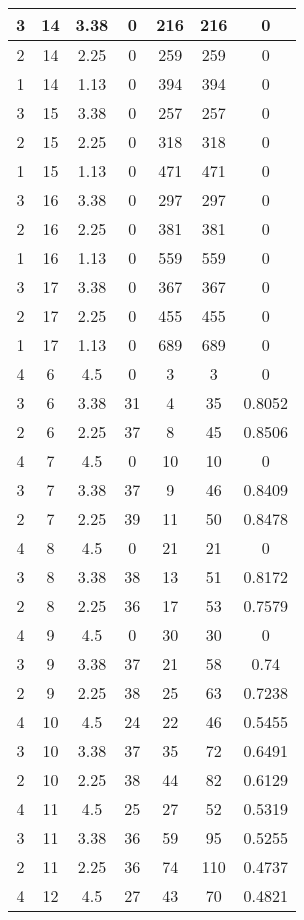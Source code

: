 \documentclass[letterpaper, 12pt]{article}
\begin{document}
\begin{longtable}{|c|c|c|c|c|c|c|}
\hline
3 & 14 & 3.38 & 0 & 216 & 216 & 0 \\
\hline
2 & 14 & 2.25 & 0 & 259 & 259 & 0 \\
\hline
1 & 14 & 1.13 & 0 & 394 & 394 & 0 \\
\hline
3 & 15 & 3.38 & 0 & 257 & 257 & 0 \\
\hline
2 & 15 & 2.25 & 0 & 318 & 318 & 0 \\
\hline
1 & 15 & 1.13 & 0 & 471 & 471 & 0 \\
\hline
3 & 16 & 3.38 & 0 & 297 & 297 & 0 \\
\hline
2 & 16 & 2.25 & 0 & 381 & 381 & 0 \\
\hline
1 & 16 & 1.13 & 0 & 559 & 559 & 0 \\
\hline
3 & 17 & 3.38 & 0 & 367 & 367 & 0 \\
\hline
2 & 17 & 2.25 & 0 & 455 & 455 & 0 \\
\hline
1 & 17 & 1.13 & 0 & 689 & 689 & 0 \\
\hline
4 & 6 & 4.5 & 0 & 3 & 3 & 0 \\
\hline
3 & 6 & 3.38 & 31 & 4 & 35 & 0.8052 \\
\hline
2 & 6 & 2.25 & 37 & 8 & 45 & 0.8506 \\
\hline
4 & 7 & 4.5 & 0 & 10 & 10 & 0 \\
\hline
3 & 7 & 3.38 & 37 & 9 & 46 & 0.8409 \\
\hline
2 & 7 & 2.25 & 39 & 11 & 50 & 0.8478 \\
\hline
4 & 8 & 4.5 & 0 & 21 & 21 & 0 \\
\hline
3 & 8 & 3.38 & 38 & 13 & 51 & 0.8172 \\
\hline
2 & 8 & 2.25 & 36 & 17 & 53 & 0.7579 \\
\hline
4 & 9 & 4.5 & 0 & 30 & 30 & 0 \\
\hline
3 & 9 & 3.38 & 37 & 21 & 58 & 0.74 \\
\hline
2 & 9 & 2.25 & 38 & 25 & 63 & 0.7238 \\
\hline
4 & 10 & 4.5 & 24 & 22 & 46 & 0.5455 \\
\hline
3 & 10 & 3.38 & 37 & 35 & 72 & 0.6491 \\
\hline
2 & 10 & 2.25 & 38 & 44 & 82 & 0.6129 \\
\hline
4 & 11 & 4.5 & 25 & 27 & 52 & 0.5319 \\
\hline
3 & 11 & 3.38 & 36 & 59 & 95 & 0.5255 \\
\hline
2 & 11 & 2.25 & 36 & 74 & 110 & 0.4737 \\
\hline
4 & 12 & 4.5 & 27 & 43 & 70 & 0.4821 \\

\end{longtable}
\end{document}
